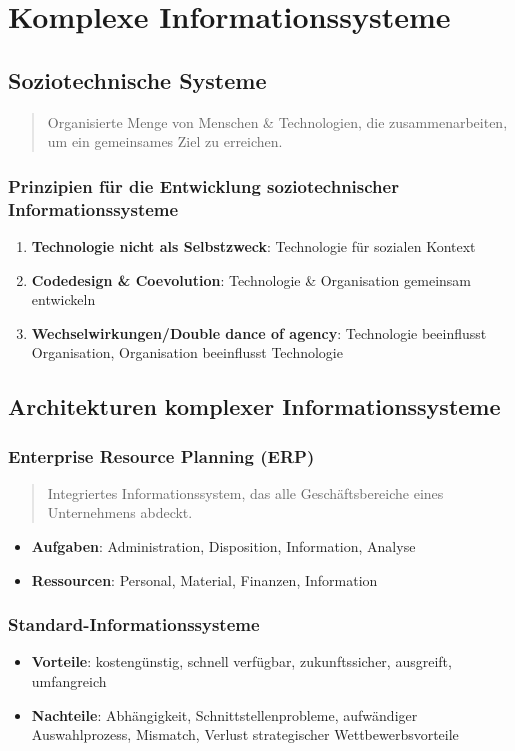 \documentclass{article}
\begin{document}
\section{Komplexe Informationssysteme}

\subsection{Soziotechnische Systeme}
\begin{quote}Organisierte Menge von Menschen \& Technologien, die zusammenarbeiten, um ein gemeinsames Ziel zu erreichen.\end{quote}

\subsubsection{Prinzipien für die Entwicklung soziotechnischer Informationssysteme}
\begin{enumerate}
  \item \textbf{Technologie nicht als Selbstzweck}: Technologie für sozialen Kontext
  \item \textbf{Codedesign \& Coevolution}: Technologie \& Organisation gemeinsam entwickeln
  \item \textbf{Wechselwirkungen/Double dance of agency}: Technologie beeinflusst Organisation, Organisation beeinflusst Technologie
\end{enumerate}

\subsection{Architekturen komplexer Informationssysteme}
\subsubsection{Enterprise Resource Planning (ERP)}
\begin{quote}Integriertes Informationssystem, das alle Geschäftsbereiche eines Unternehmens abdeckt.\end{quote}

\begin{itemize}
  \item \textbf{Aufgaben}: Administration, Disposition, Information, Analyse
  \item \textbf{Ressourcen}: Personal, Material, Finanzen, Information
\end{itemize}

\subsubsection{Standard-Informationssysteme}
\begin{itemize}
  \item \textbf{Vorteile}: kostengünstig, schnell verfügbar, zukunftssicher, ausgreift, umfangreich
  \item \textbf{Nachteile}: Abhängigkeit, Schnittstellenprobleme, aufwändiger Auswahlprozess, Mismatch, Verlust strategischer Wettbewerbsvorteile
\end{itemize}
\end{document}
